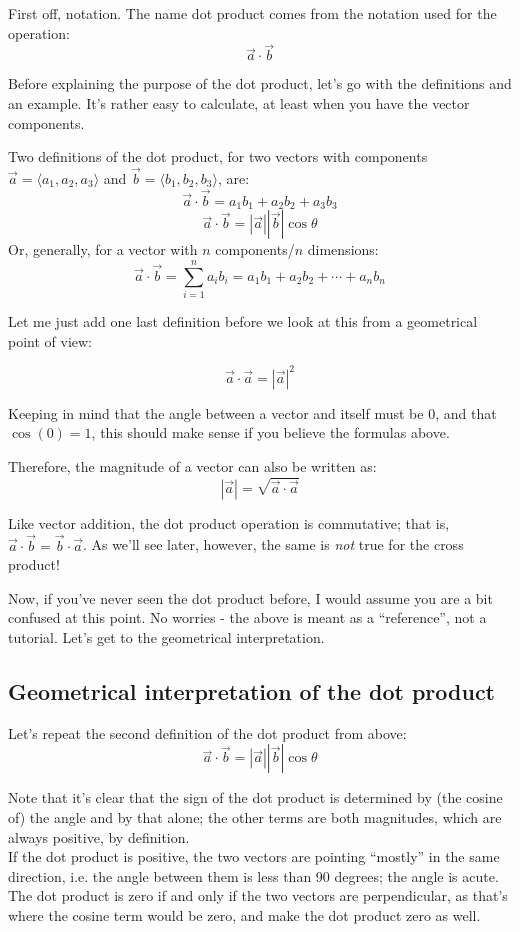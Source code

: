 \documentclass[8.01x]{subfiles}
\begin{document}
First off, notation. The name dot product comes from the notation used for the operation:
\[ \vec{a} \cdot \vec{b} \]

Before explaining the purpose of the dot product, let's go with the definitions and an example. It's rather easy to calculate, at least when you have the vector components.

Two definitions of the dot product, for two vectors with components $\vec{a} = \langle a_1, a_2, a_3 \rangle$ and $\vec{b} = \langle b_1, b_2, b_3 \rangle$, are:
\[ \vec{a} \cdot \vec{b} = a_1 b_1 + a_2 b_2 + a_3 b_3 \]
\[ \vec{a} \cdot \vec{b} = |\vec{a}| |\vec{b}| \cos{\theta} \]
Or, generally, for a vector with $n$ components/$n$ dimensions:
\[ \vec{a} \cdot \vec{b} = \sum_{i=1}^n a_i b_i = a_1 b_1 + a_2 b_2 + \cdots + a_n b_n \]

Let me just add one last definition before we look at this from a geometrical point of view:

\[ \vec{a} \cdot \vec{a} = |\vec{a}|^2 \]

Keeping in mind that the angle between a vector and itself must be 0, and that $\cos{(0)} = 1$, this should make sense if you believe the formulas above.

Therefore, the magnitude of a vector can also be written as:
\[ |\vec{a}| = \sqrt{\vec{a} \cdot \vec{a}} \]

Like vector addition, the dot product operation is commutative; that is, $\vec{a} \cdot \vec{b} = \vec{b} \cdot \vec{a}$. As we'll see later, however, the same is \emph{not} true for the cross product!

Now, if you've never seen the dot product before, I would assume you are a bit confused at this point. No worries - the above is meant as a ``reference'', not a tutorial. Let's get to the geometrical interpretation.

\subsection{Geometrical interpretation of the dot product}
Let's repeat the second definition of the dot product from above:
\[ \vec{a} \cdot \vec{b} = |\vec{a}| |\vec{b}| \cos{\theta} \]

Note that it's clear that the sign of the dot product is determined by (the cosine of) the angle and by that alone; the other terms are both magnitudes, which are always positive, by definition.\\
If the dot product is positive, the two vectors are pointing ``mostly'' in the same direction, i.e. the angle between them is less than 90 degrees; the angle is acute.
The dot product is zero if and only if the two vectors are perpendicular, as that's where the cosine term would be zero, and make the dot product zero as well.
\end{document}
